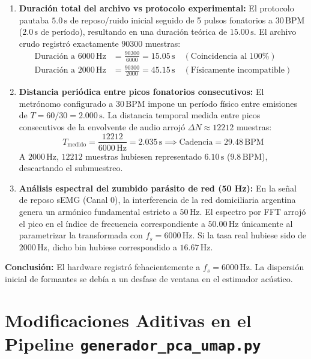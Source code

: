 \documentclass[11pt,a4paper]{article}
\begin{document}
\begin{enumerate}
    \item \textbf{Duración total del archivo vs protocolo experimental:}
    El protocolo pautaba $5.0\,\text{s}$ de reposo/ruido inicial seguido de 5 pulsos fonatorios a $30\,\text{BPM}$ ($2.0\,\text{s}$ de período), resultando en una duración teórica de $15.00\,\text{s}$. El archivo crudo registró exactamente $90300$ muestras:
    \begin{align}
        \text{Duración a } 6000\,\text{Hz} &= \frac{90300}{6000} = 15.05\,\text{s} \quad (\text{Coincidencia al } 100\%) \\
        \text{Duración a } 2000\,\text{Hz} &= \frac{90300}{2000} = 45.15\,\text{s} \quad (\text{Físicamente incompatible})
    \end{align}

    \item \textbf{Distancia periódica entre picos fonatorios consecutivos:}
    El metrónomo configurado a $30\,\text{BPM}$ impone un período físico entre emisiones de $T = 60/30 = 2.000\,\text{s}$. La distancia temporal medida entre picos consecutivos de la envolvente de audio arrojó $\Delta N \approx 12212$ muestras:
    \begin{equation}
        T_{\text{medido}} = \frac{12212}{6000\,\text{Hz}} = 2.035\,\text{s} \implies \text{Cadencia} = 29.48\,\text{BPM}
    \end{equation}
    A $2000\,\text{Hz}$, $12212$ muestras hubiesen representado $6.10\,\text{s}$ ($9.8\,\text{BPM}$), descartando el submuestreo.

    \item \textbf{Análisis espectral del zumbido parásito de red (50 Hz):}
    En la señal de reposo sEMG (Canal 0), la interferencia de la red domiciliaria argentina genera un armónico fundamental estricto a $50\,\text{Hz}$. El espectro por FFT arrojó el pico en el índice de frecuencia correspondiente a $50.00\,\text{Hz}$ únicamente al parametrizar la transformada con $f_s = 6000\,\text{Hz}$. Si la tasa real hubiese sido de $2000\,\text{Hz}$, dicho bin hubiese correspondido a $16.67\,\text{Hz}$.
\end{enumerate}

\textbf{Conclusión:} El hardware registró fehacientemente a $f_s = 6000\,\text{Hz}$. La dispersión inicial de formantes se debía a un desfase de ventana en el estimador acústico.

\section{Modificaciones Aditivas en el Pipeline \texttt{generador\_pca\_umap.py}}
\end{document}
